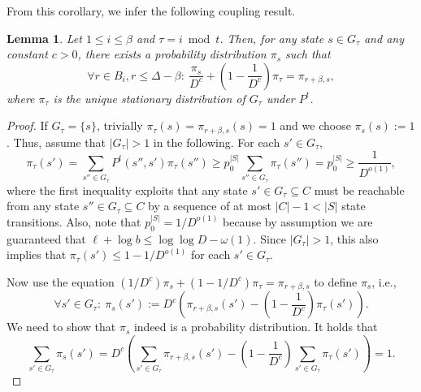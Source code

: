 \documentclass[11pt]{article}
\newtheorem{lemma}[theorem]{Lemma}
\begin{document}
From this corollary, we infer the following coupling result.
\begin{lemma}
\label{lem:pi_s}
	Let $1 \leq i \leq \beta$ and $\tau = i \bmod t$. Then, for any state $s \in G_{\tau}$ and any constant $c>0$, there exists a probability distribution $\pi_s$ such that
\begin{equation*}
\forall r \in B_i, r \leq \Delta - \beta:~ \frac{\pi_s}{D^c} + \left(1 - \frac{1}{D^c}\right)\pi_{\tau} = \pi_{r+\beta,s},
\end{equation*}
where $\pi_{\tau}$ is the unique stationary distribution of $G_{\tau}$ under $P^t$.
\end{lemma}
\begin{proof}
If $G_{\tau}=\{s\}$, trivially $\pi_{\tau}(s)=\pi_{r+\beta,s}(s)=1$ and we choose $\pi_s(s):=1$. Thus, assume that $|G_{\tau}|>1$ in the following. For each $s'\in G_{\tau}$,
\begin{equation*}
\pi_{\tau}(s') = \sum_{s''\in G_{\tau}}P^t(s'',s')\pi_{\tau}(s'') \geq p_0^{|S|}\sum_{s''\in G_{\tau}}\pi_{\tau}(s'') = p_0^{|S|}\geq \frac{1}{D^{o(1)}},
\end{equation*}
where the first inequality exploits that any state $s'\in G_{\tau}\subseteq C$ must be reachable from any state $s''\in G_{\tau}\subseteq C$ by a sequence of at most $|C|-1<|S|$ state transitions. Also, note that $p_0^{|S|} = 1/D^{o(1)}$ because by assumption we are guaranteed that $\ell + \log b \leq \log \log D - \omega(1)$. Since $|G_{\tau}|>1$, this also implies that $\pi_{\tau}(s')\leq 1-1/D^{o(1)}$ for each $s'\in G_{\tau}$.

	Now use the equation $(1/D^c) \pi_s + (1 - 1/D^c) \pi_{\tau} = \pi_{r+\beta,s}$ to define $\pi_s$, i.e.,
	\begin{equation}
	\forall s'\in G_{\tau}:~\pi_s(s'):=  D^c\left(\pi_{r+\beta,s}(s')-\left(1 - \frac{1}{D^c}\right) \pi_{\tau}(s')\right).\label{eq:def_pi_s}
	\end{equation}
	We need to show that $\pi_s$ indeed is a probability distribution. It holds that
	\begin{equation*}
	\sum_{s'\in G_{\tau}}\pi_s(s')=D^c\left(\sum_{s'\in G_{\tau}}\pi_{r+\beta,s}(s')-\left(1 - \frac{1}{D^c}\right) \sum_{s'\in G_{\tau}}\pi_{\tau}(s')\right)=1.
	\end{equation*}
	

\end{proof}
\end{document}
